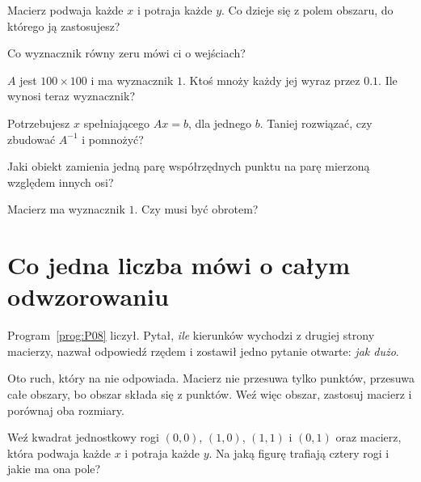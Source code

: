 \begin{quiz}
\item Macierz podwaja każde $x$ i potraja każde $y$. Co dzieje się z polem
  obszaru, do którego ją zastosujesz? 
\item Co wyznacznik równy zeru mówi ci o wejściach? 
\item $A$ jest $100 \times 100$ i ma wyznacznik $1$. Ktoś mnoży każdy jej wyraz
  przez $\num{0.1}$. Ile wynosi teraz wyznacznik? 
\item Potrzebujesz $x$ spełniającego $Ax = b$, dla jednego $b$. Taniej
  rozwiązać, czy zbudować $A^{-1}$ i pomnożyć? 
\item Jaki obiekt zamienia jedną parę współrzędnych punktu na parę mierzoną
  względem innych osi? 
\item Macierz ma wyznacznik $1$. Czy musi być obrotem? 
\end{quiz}

\section{Co jedna liczba mówi o całym odwzorowaniu}
\label{sec:P09-signed-area}

\begin{fr}
Program~\ref{prog:P08} liczył. Pytał, \emph{ile} kierunków wychodzi z drugiej
strony macierzy, nazwał odpowiedź rzędem i zostawił jedno pytanie otwarte:
\emph{jak dużo}.

Oto ruch, który na nie odpowiada. Macierz nie przesuwa tylko punktów, przesuwa
całe obszary, bo obszar składa się z punktów. Weź więc obszar, zastosuj macierz
i porównaj oba rozmiary.

Weź kwadrat jednostkowy \dash{} rogi $(0,0)$, $(1,0)$, $(1,1)$ i $(0,1)$
\dash{} oraz macierz, która podwaja każde $x$ i potraja każde $y$. Na jaką
figurę trafiają cztery rogi i jakie ma ona pole?
\dotline
\nextframe
\end{fr}

